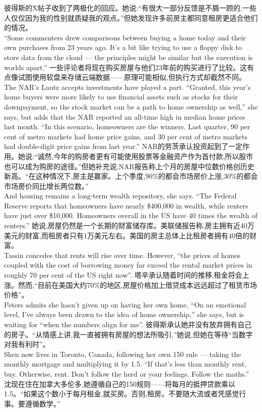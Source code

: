 \documentclass[a4paper,12pt]{article}
\begin{document}
彼得斯的X帖子收到了两极化的回应。她说:“有很大一部分反馈是不屑一顾的,一些人仅仅因为我的性别就质疑我的观点。”但她发现许多前房主都同意租房更适合他们的情况。
\\“Some commenters drew comparisons between buying a home today and their own purchases from 23 years ago. It's a bit like trying to use a floppy disk to store data from the cloud — the principles might be similar but the execution is worlds apart.”
一些评论者将现在购买房屋与他们23年前的购买进行了比较。这有点像试图使用软盘来存储云端数据——原理可能相似,但执行方式却截然不同。
\\The NAR's Lautz accepts investments have played a part. “Granted, this year's home buyers were more likely to use financial assets such as stocks for their downpayment, so the stock market can be a path to home ownership as well,” she says, but adds that the NAR reported an all-time high in median home prices last month. “In this scenario, homeowners are the winners. Last quarter, 90 per cent of metro markets had home price gains, and 30 per cent of metro markets had double-digit price gains from last year.”
NAR的劳茨承认投资起到了一定作用。她说:“诚然,今年的购房者更有可能使用股票等金融资产作为首付款,所以股市也可以成为购房的途径。”但她补充说,NAR报告称上个月的房屋中位数价格创历史新高。“在这种情况下,房主是赢家。上个季度,90\%的都会市场房价上涨,30\%的都会市场房价同比增长两位数。”
\\And housing remains a long-term wealth repository, she says. “The Federal Reserve reports that homeowners have nearly \$400,000 in wealth, while renters have just over \$10,000. Homeowners overall in the US have 40 times the wealth of renters.”
她说,房屋仍然是一个长期的财富储存库。美联储报告称,房主拥有近40万美元的财富,而租房者只有1万美元左右。美国的房主总体上比租房者拥有40倍的财富。
\\Tassin concedes that rents will rise over time. However, “the prices of homes coupled with the cost of borrowing money far exceed the rental market prices in roughly 70 per cent of the US right now”.
塔辛承认随着时间的推移,租金将会上涨。然而,“目前在美国大约70\%的地区,房屋价格加上借贷成本远远超过了租赁市场价格”。
\\Peters admits she hasn't given up on having her own home. “On an emotional level, I've always been drawn to the idea of home ownership,” she says, but is waiting for “when the numbers align for me”.
彼得斯承认她并没有放弃拥有自己的房子。“从情感上讲,我一直被拥有房屋的想法所吸引,”她说,但她在等待“当数字对我有利时”。
\\Shen now lives in Toronto, Canada, following her own 150 rule — taking the monthly mortgage and multiplying it by 1.5. “If that's less than monthly rent, buy. Otherwise, rent. Don't follow the herd or your feelings. Follow the maths.”
沈现在住在加拿大多伦多,她遵循自己的150规则——将每月的抵押贷款乘以1.5。“如果这个数小于每月租金,就买房。否则,租房。不要随大流或者凭感觉行事。要遵循数学。”
\end{document}
